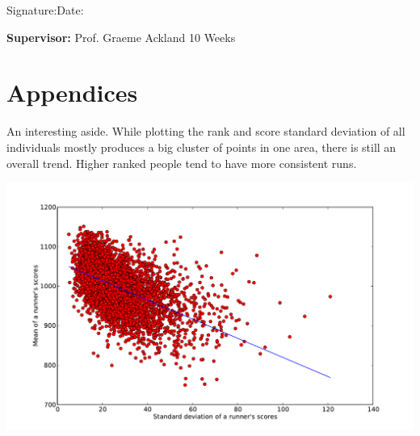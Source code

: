 \documentclass[a4paper,12pt]{article}
\begin{document}
\vspace*{2cm}
Signature:\hspace*{8cm}Date:

\vfill
{\bf Supervisor:} Prof. Graeme Ackland                %
\hfill
10 Weeks                                         %
\newpage
%
\pagestyle{plain}                               %
\setcounter{page}{1}                            %
\tableofcontents                                %
\newpage


\FloatBarrier

\FloatBarrier

\FloatBarrier

%
%
\FloatBarrier

\FloatBarrier

\newpage
{}



\newpage      
\appendix
\section{Appendices}

An interesting aside. While plotting the rank and score standard deviation of all individuals mostly produces a big cluster of points in one area, there is still an overall trend. Higher ranked people tend to have more consistent runs.

\includegraphics[width=\textwidth]{./images/meanVsstd.pdf}
\end{document}
